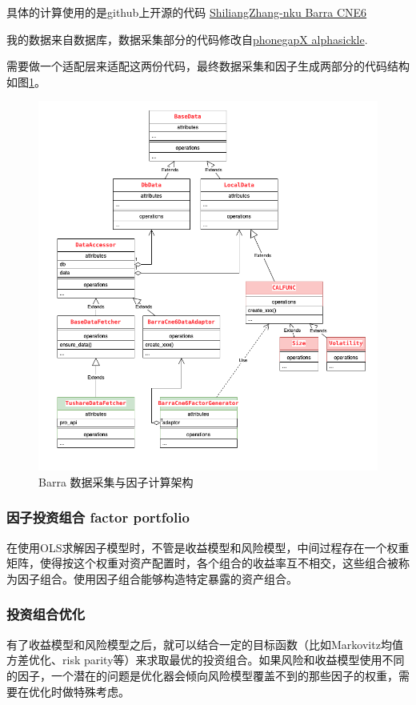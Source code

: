 \documentclass[11pt,oneside,a4paper,notitlepage]{article}
\begin{document}
\begin{CJK}{UTF8}{gbsn}
具体的计算使用的是github上开源的代码 
\href{https://github.com/ShiliangZhang-nku/Barra_CNE6}{ShiliangZhang-nku Barra CNE6}

我的数据来自数据库，数据采集部分的代码修改自\href{https://github.com/phonegapX/alphasickle}{phonegapX alphasickle}.

需要做一个适配层来适配这两份代码，最终数据采集和因子生成两部分的代码结构如图\ref{fig:cne6}。
\begin{figure}
  \centering
  \includegraphics[scale=0.6]{figures/cne6.png}
  \caption{Barra 数据采集与因子计算架构}
  \label{fig:cne6}
\end{figure}





\subsubsection{因子投资组合 factor portfolio}
在使用OLS求解因子模型时，不管是收益模型和风险模型，中间过程存在一个权重矩阵，使得按这个权重对资产配置时，各个组合的收益率互不相交，这些组合被称为因子组合。使用因子组合能够构造特定暴露的资产组合。

\subsubsection{投资组合优化}
有了收益模型和风险模型之后，就可以结合一定的目标函数（比如Markovitz均值方差优化、risk parity等）来求取最优的投资组合。如果风险和收益模型使用不同的因子，一个潜在的问题是优化器会倾向风险模型覆盖不到的那些因子的权重，需要在优化时做特殊考虑。


\end{CJK}
\end{document}
